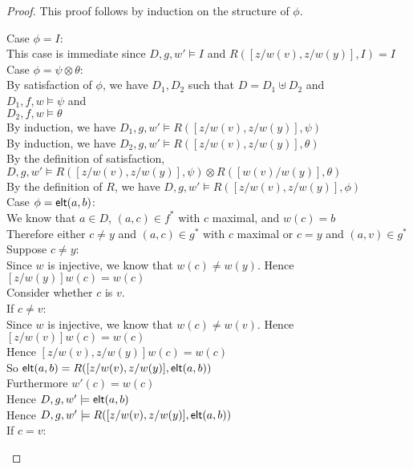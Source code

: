 \begin{proof}
This proof follows by induction on the structure of $\phi$. 

\begin{tabbedproof}
\oo Case $\phi = I$: \\
\ooo This case is immediate since $D, g, w' \models I$  and $R([z/w(v), z/w(y)],I) = I$ \\
\oo Case $\phi = \psi \otimes \theta$: \\
\ooo By satisfaction of $\phi$, we have $D_1, D_2$ such that $D = D_1 \uplus D_2$ and \\
\ooox $D_1, f, w \models \psi$ and\\
\ooox $D_2, f, w \models \theta$ \\
\ooo By induction, we have $D_1, g, w' \models R([z/w(v), z/w(y)], \psi)$ \\ 
\ooo By induction, we have $D_2, g, w' \models R([z/w(v), z/w(y)], \theta)$ \\ 
\ooo By the definition of satisfaction, $D, g, w' \models  R([z/w(v), z/w(y)], \psi)\otimes R([w(v)/w(y)], \theta)$ \\ 
\ooo By the definition of $R$, we have $D, g, w' \models  R([z/w(v), z/w(y)], \phi)$  \\
\oo Case $\phi = \mathsf{elt}({a}, {b})$: \\
\ooo We know that $a \in D$, $(a,c) \in f^*$ with $c$ maximal, and $w(c) = b$ \\
\ooo Therefore either $c \not= y$ and $(a,c) \in g^*$ with $c$ maximal or $c = y$ and $(a, v) \in g^*$ \\
\ooo Suppose $c \not= y$: \\
\oooo Since $w$ is injective, we know that $w(c) \not= w(y)$. Hence $[z/w(y)]w(c) = w(c)$ \\
\oooo Consider whether $c$ is $v$.  \\
\oooo If $c \not= v$:  \\
\ooooo Since $w$ is injective, we know that $w(c) \not= w(v)$. Hence $[z/w(v)]w(c) = w(c)$ \\
\ooooo Hence $[z/w(v), z/w(y)]w(c) = w(c)$ \\
\ooooo So $\mathsf{elt}({a}, {b}) = R([z/w(v),z/w(y)], \mathsf{elt}({a}, {b}))$ \\
\ooooo Furthermore $w'(c) = w(c)$ \\
\ooooo Hence $D, g, w' \models \mathsf{elt}({a}, {b})$ \\
\ooooo Hence $D, g, w' \models R([z/w(v), z/w(y)], \mathsf{elt}({a}, {b}))$ \\
\oooo If $c = v$: \\

\end{tabbedproof}
\end{proof}
